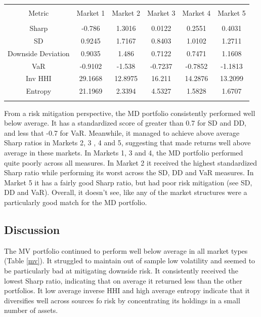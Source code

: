 \documentclass[11pt,preprint, authoryear]{elsarticle}
\let\origtable\table
\let\endorigtable\endtable
\renewenvironment{table}[1][2] {
    \expandafter\origtable\expandafter[H]
} {
    \endorigtable
}
\numberwithin{equation}{section}
\numberwithin{figure}{section}
\numberwithin{table}{section}
\begin{document}
\begin{table}[!htbp] \centering 
  \caption{Maximum Diversification} 
  \label{md} 
\begin{tabular}{@{\extracolsep{5pt}} cccccc} 
\\[-1.8ex]\hline 
\hline \\[-1.8ex] 
Metric & Market 1 & Market 2 & Market 3 & Market 4 & Market 5 \\ 
\hline \\[-1.8ex] 
Sharp & -0.786 & 1.3016 & 0.0122 & 0.2551 & 0.4031 \\ 
SD & 0.9245 & 1.7167 & 0.8403 & 1.0102 & 1.2711 \\ 
Downside Deviation & 0.9035 & 1.486 & 0.7122 & 0.7471 & 1.1608 \\ 
VaR & -0.9102 & -1.538 & -0.7237 & -0.7852 & -1.1813 \\ 
Inv HHI & 29.1668 & 12.8975 & 16.211 & 14.2876 & 13.2099 \\ 
Entropy & 21.1969 & 2.3394 & 4.5327 & 1.5828 & 1.6707 \\ 
\hline \\[-1.8ex] 
\end{tabular} 
\end{table}

From a risk mitigation perspective, the MD portfolio consistently
performed well below average. It has a standardized score of greater
than 0.7 for SD and DD, and less that -0.7 for VaR. Meanwhile, it
managed to achieve above average Sharp ratios in Markets 2, 3 , 4 and 5,
suggesting that made returns well above average in these markets. In
Markets 1, 3 and 4, the MD portfolio performed quite poorly across all
measures. In Market 2 it received the highest standardized Sharp ratio
while performing its worst across the SD, DD and VaR measures. In Market
5 it has a fairly good Sharp ratio, but had poor risk mitigation (see
SD, DD and VaR). Overall, it doesn't see, like any of the market
structures were a particularly good match for the MD portfolio.

\hypertarget{discussion}{%
\subsection{Discussion}\label{discussion}}

The MV portfolio continued to perform well below average in all market
types (Table \ref{mv}). It struggled to maintain out of sample low
volatility and seemed to be particularly bad at mitigating downside
risk. It consistently received the lowest Sharp ratio, indicating that
on average it returned less than the other portfolios. It low average
inverse HHI and high average entropy indicate that it diversifies well
across sources fo risk by concentrating its holdings in a small number
of assets.
\end{document}
